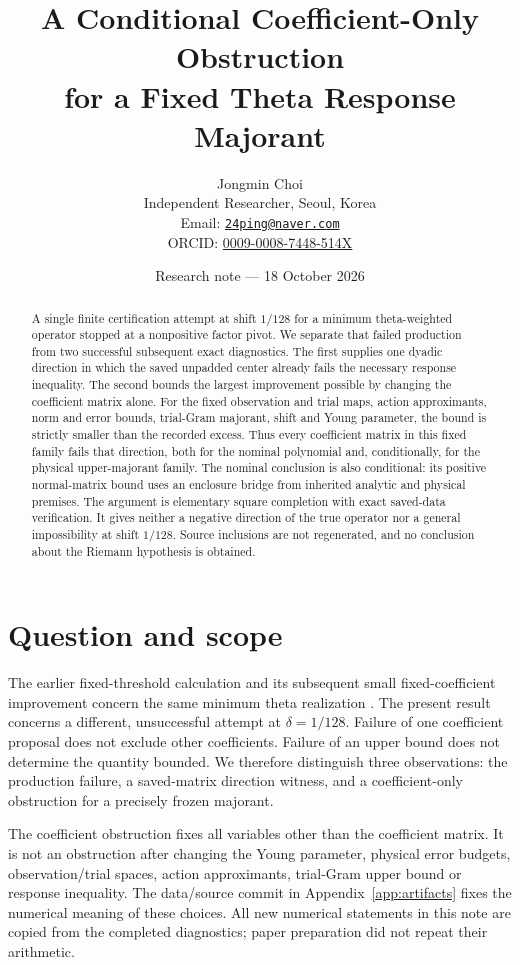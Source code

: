 \documentclass[11pt,a4paper]{article}
\title{A Conditional Coefficient-Only Obstruction\\for a Fixed Theta Response Majorant}
\author{Jongmin Choi\\[2pt]
\small Independent Researcher, Seoul, Korea\\
\small Email: \href{mailto:24ping@naver.com}{\texttt{24ping@naver.com}}\\
\small ORCID: \href{https://orcid.org/0009-0008-7448-514X}{0009-0008-7448-514X}}
\date{Research note --- 18 October 2026}
\theoremstyle{definition}
\theoremstyle{remark}
\numberwithin{equation}{section}
\begin{document}
\maketitle
\begin{abstract}
A single finite certification attempt at shift $1/128$ for a minimum
theta-weighted operator stopped at a nonpositive factor pivot. We separate
that failed production from two successful subsequent exact diagnostics.
The first supplies one dyadic direction in which the saved unpadded center
already fails the necessary response inequality. The second bounds the
largest improvement possible by changing the coefficient matrix alone.
For the fixed observation and trial maps, action approximants, norm and
error bounds, trial-Gram majorant, shift and Young parameter, the bound is
strictly smaller than the recorded excess. Thus every coefficient matrix
in this fixed family fails that direction, both for the nominal polynomial
and, conditionally, for the physical upper-majorant family. The nominal
conclusion is also conditional: its positive normal-matrix bound uses an
enclosure bridge from inherited analytic and physical premises.
The argument is elementary square completion with exact saved-data
verification. It gives neither a negative direction of the true operator
nor a general impossibility at shift $1/128$. Source inclusions are not
regenerated, and no conclusion about the Riemann hypothesis is obtained.
\end{abstract}

\section{Question and scope}

The earlier fixed-threshold calculation and its subsequent small
fixed-coefficient improvement concern the same minimum theta realization
\cite{archive,shift}. The present result concerns a different, unsuccessful
attempt at $\delta=1/128$. Failure of one coefficient proposal does not
exclude other coefficients. Failure of an upper bound does not determine
the quantity bounded. We therefore distinguish three observations:
the production failure, a saved-matrix direction witness, and a
coefficient-only obstruction for a precisely frozen majorant.

The coefficient obstruction fixes all variables other than the coefficient
matrix. It is not an obstruction after changing the Young parameter,
physical error budgets, observation/trial spaces, action approximants,
trial-Gram upper bound or response inequality. The data/source commit
in Appendix~\ref{app:artifacts} fixes the numerical meaning of these choices.
All new numerical statements in this note are copied from the completed
diagnostics; paper preparation did not repeat their arithmetic.
\end{document}
